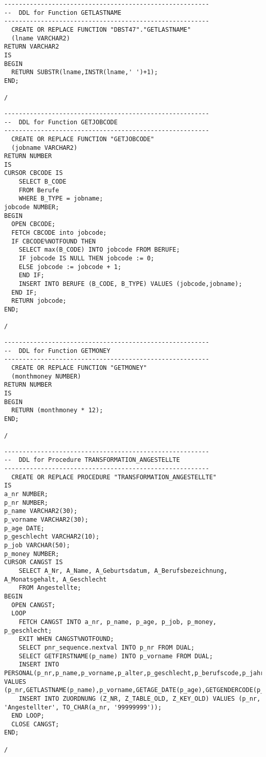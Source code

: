 \documentclass{scrartcl}
\begin{document}
\begin{lstlisting}
--------------------------------------------------------
--  DDL for Function GETLASTNAME
--------------------------------------------------------
  CREATE OR REPLACE FUNCTION "DBST47"."GETLASTNAME" 
  (lname VARCHAR2)
RETURN VARCHAR2
IS
BEGIN
  RETURN SUBSTR(lname,INSTR(lname,' ')+1);
END;

/
\end{lstlisting}

\begin{lstlisting}
--------------------------------------------------------
--  DDL for Function GETJOBCODE
--------------------------------------------------------
  CREATE OR REPLACE FUNCTION "GETJOBCODE" 
  (jobname VARCHAR2)
RETURN NUMBER
IS
CURSOR CBCODE IS
	SELECT B_CODE
	FROM Berufe
	WHERE B_TYPE = jobname;
jobcode NUMBER;
BEGIN
  OPEN CBCODE;
  FETCH CBCODE into jobcode;
  IF CBCODE%NOTFOUND THEN 
    SELECT max(B_CODE) INTO jobcode FROM BERUFE; 
    IF jobcode IS NULL THEN jobcode := 0;
    ELSE jobcode := jobcode + 1;
    END IF;
    INSERT INTO BERUFE (B_CODE, B_TYPE) VALUES (jobcode,jobname); 
  END IF;
  RETURN jobcode;
END;

/
\end{lstlisting}

\begin{lstlisting}
--------------------------------------------------------
--  DDL for Function GETMONEY
--------------------------------------------------------
  CREATE OR REPLACE FUNCTION "GETMONEY" 
  (monthmoney NUMBER)
RETURN NUMBER
IS
BEGIN
  RETURN (monthmoney * 12);
END;

/
\end{lstlisting}

\begin{lstlisting}
--------------------------------------------------------
--  DDL for Procedure TRANSFORMATION_ANGESTELLTE
--------------------------------------------------------
  CREATE OR REPLACE PROCEDURE "TRANSFORMATION_ANGESTELLTE" 
IS
a_nr NUMBER;
p_nr NUMBER;
p_name VARCHAR2(30);
p_vorname VARCHAR2(30);
p_age DATE;
p_geschlecht VARCHAR2(10);
p_job VARCHAR(50);
p_money NUMBER;
CURSOR CANGST IS
	SELECT A_Nr, A_Name, A_Geburtsdatum, A_Berufsbezeichnung, A_Monatsgehalt, A_Geschlecht
	FROM Angestellte;
BEGIN
  OPEN CANGST;
  LOOP 
	FETCH CANGST INTO a_nr, p_name, p_age, p_job, p_money, p_geschlecht;
	EXIT WHEN CANGST%NOTFOUND;
	SELECT pnr_sequence.nextval INTO p_nr FROM DUAL;
  	SELECT GETFIRSTNAME(p_name) INTO p_vorname FROM DUAL;
  	INSERT INTO PERSONAL(p_nr,p_name,p_vorname,p_alter,p_geschlecht,p_berufscode,p_jahreseinkommen) VALUES (p_nr,GETLASTNAME(p_name),p_vorname,GETAGE_DATE(p_age),GETGENDERCODE(p_geschlecht,p_vorname),GETJOBCODE(p_job),GETMONEY(p_money));
	INSERT INTO ZUORDNUNG (Z_NR, Z_TABLE_OLD, Z_KEY_OLD) VALUES (p_nr, 'Angestellter', TO_CHAR(a_nr, '99999999'));
  END LOOP; 
  CLOSE CANGST;
END;

/
\end{lstlisting}
\end{document}
